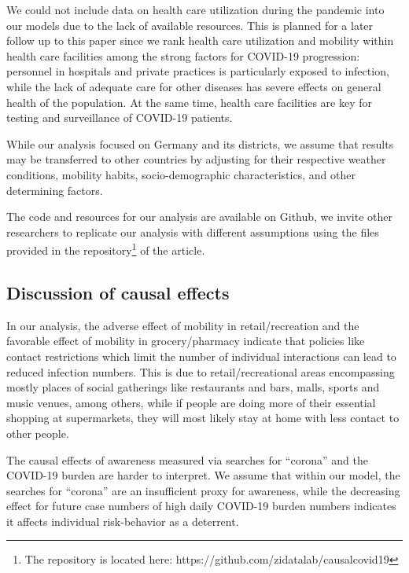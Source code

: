 \documentclass[]{elsarticle} %
\begin{document}
We could not include data on health care utilization during the pandemic into our models due to the lack of available resources. This is planned for a later follow up to this paper since we rank health care utilization and mobility within health care facilities among the strong factors for COVID-19 progression: personnel in hospitals and private practices is particularly exposed to infection, while the lack of adequate care for other diseases has severe effects on general health of the population. At the same time, health care facilities are key for testing and surveillance of COVID-19 patients.

While our analysis focused on Germany and its districts, we assume that results may be transferred to other countries by adjusting for their respective weather conditions, mobility habits, socio-demographic characteristics, and other determining factors.

The code and resources for our analysis are available on Github, we invite other researchers to replicate our analysis with different assumptions using the files provided in the repository\footnote{The repository is located here: https://github.com/zidatalab/causalcovid19} of the article.

\hypertarget{discussion-of-causal-effects}{%
\subsection{Discussion of causal effects}\label{discussion-of-causal-effects}}

In our analysis, the adverse effect of mobility in retail/recreation and the favorable effect of mobility in grocery/pharmacy indicate that policies like contact restrictions which limit the number of individual interactions can lead to reduced infection numbers. This is due to retail/recreational areas encompassing mostly places of social gatherings like restaurants and bars, malls, sports and music venues, among others, while if people are doing more of their essential shopping at supermarkets, they will most likely stay at home with less contact to other people.

The causal effects of awareness measured via searches for ``corona'' and the COVID-19 burden are harder to interpret. We assume that within our model, the searches for ``corona'' are an insufficient proxy for awareness, while the decreasing effect for future case numbers of high daily COVID-19 burden numbers indicates it affects individual risk-behavior as a deterrent.
\end{document}
